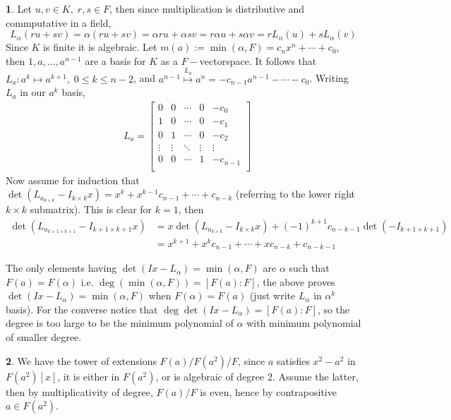 \documentclass[11pt]{article}
\theoremstyle{definition}
\newtheorem{pb}{}
\begin{document}
    \begin{pb}
        Let \(u,v \in K, \; r,s \in F \), then since multiplication is distributive and commputative in a field,
        \[L_\alpha (ru + sv ) = \alpha(ru + sv) = \alpha ru + \alpha sv = r \alpha u + s \alpha v = r L_\alpha(u) + s L_\alpha(v)\]
        Since \(K \) is finite it is algebraic. Let \(m(a) := \min(\alpha,F) = c_nx^n + \cdots + c_0\), then \(1, a, \hdots, a^{n-1}\) are a basis for \(K\) as a \(F-\)vectorspace.
        It follows that \(L_a: a^k \mapsto a^{k+1}, \; 0 \leq k \leq n-2\), and \(a^{n-1} \overset{L_a}{\mapsto} a^n = -c_{n-1}a^{n-1} - \cdots - c_0\). Writing \(L_a\) in our \(a^k \) basis,
        \begin{align*}
            &L_a = \begin{bmatrix} 
                0 & 0 & \cdots & 0 & -c_0 \\
                1 & 0 & \cdots & 0 & -c_1 \\
                0 & 1 & \cdots & 0 & -c_2 \\
                \vdots & \vdots & \ddots & \vdots & \vdots \\
                0 & 0 & \cdots & 1 & -c_{n-1} \\
        \end{bmatrix}
        \end{align*}
        Now assume for induction that \(\det(L_{a_{k\times k}} - I_{k\times k}x) = x^k + x^{k-1}c_{n-1} + \cdots + c_{n-k}\) (referring to the lower right \(k \times k \) submatrix).
        This is clear for \(k=1\), then
        \begin{align*}
            \det(L_{a_{k+1\times k+1}} - I_{k+1\times k+1}x) &= x\det(L_{a_{k\times k}} - I_{k\times k}x ) + (-1)^{k+1}c_{n-k-1}\det(-I_{k+1\times k+1}) \\
            &= x^{k+1} + x^{k}c_{n-1} + \cdots + xc_{n-k} + c_{n-k-1}
        \end{align*}
        
        The only elements having \(\det(Ix - L_\alpha) = \min(\alpha,F)\) are \(\alpha\) such that \(F(a) = F(\alpha)\) i.e. \(\deg(\min(\alpha,F)) = [F(a):F]\), 
        the above proves \(\det(Ix - L_\alpha) = \min(\alpha,F)\) when \(F(\alpha) = F(a)\) (just write \(L_\alpha\) in \(\alpha^k\) basis). For the converse 
        notice that \(\deg \det(Ix - L_\alpha) = [F(a):F]\), so the degree is too large to be the minimum polynomial of \(\alpha\) with minimum polynomial of smaller degree.
    \end{pb}
    \begin{pb}
        We have the tower of extensions \(F(a)/F(a^2)/F\), since \(a\) satisfies \(x^2 - a^2\) in \(F(a^2)[x]\), it is either in \(F(a^2)\), or is algebraic of degree 2.
        Assume the latter, then by multiplicativity of degree, \(F(a)/F\) is even, hence by contrapositive \(a \in F(a^2)\).
    \end{pb}
\end{document}
